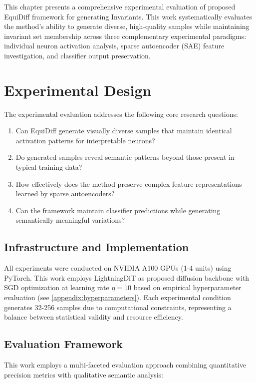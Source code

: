 \documentclass[licencjacka,en]{pracamgr}
\newcommand{\method}[1]{EquiDiff}  %
\newcommand{\framework}[1]{Invariants}  %
\begin{document}
This chapter presents a comprehensive experimental evaluation of proposed \method{} framework for generating \framework{}. This work systematically evaluates the method's ability to generate diverse, high-quality samples while maintaining invariant set membership across three complementary experimental paradigms: individual neuron activation analysis, sparse autoencoder (SAE) feature investigation, and classifier output preservation.

\section{Experimental Design}

The experimental evaluation addresses the following core research questions:
\begin{enumerate}
\item Can \method{} generate visually diverse samples that maintain identical activation patterns for interpretable neurons?
\item Do generated samples reveal semantic patterns beyond those present in typical training data?
\item How effectively does the method preserve complex feature representations learned by sparse autoencoders?
\item Can the framework maintain classifier predictions while generating semantically meaningful variations?
\end{enumerate}

\subsection{Infrastructure and Implementation}

All experiments were conducted on NVIDIA A100 GPUs (1-4 units) using PyTorch. This work employs LightningDiT as proposed diffusion backbone with SGD optimization at learning rate $\eta = 10$ based on empirical hyperparameter evaluation (see \cref{appendix:hyperparameters}). Each experimental condition generates 32-256 samples due to computational constraints, representing a balance between statistical validity and resource efficiency.

\subsection{Evaluation Framework}

This work employs a multi-faceted evaluation approach combining quantitative precision metrics with qualitative semantic analysis:
\end{document}
